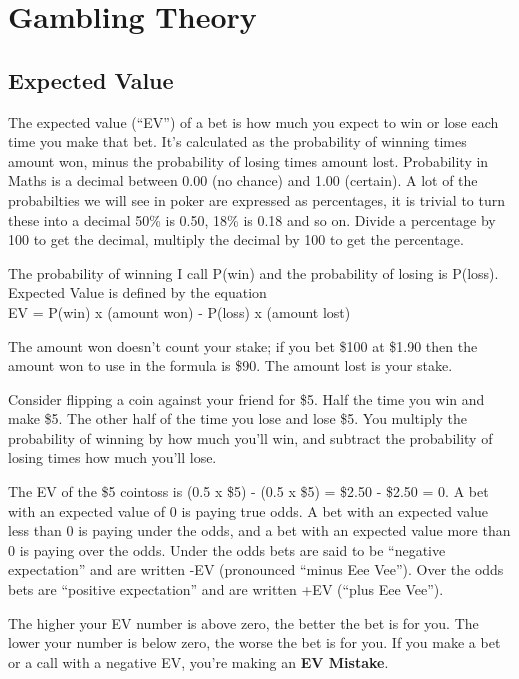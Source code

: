 \chapter{Gambling Theory}



\section{Expected Value}

The expected value (``EV'') of a bet is how much you expect to win or lose
each time you make that bet. It's calculated as the probability of
winning times amount won, minus the probability of losing times amount
lost. Probability in Maths is a decimal between 0.00 (no chance)
and 1.00 (certain). A lot of the probabilties we will see in poker
are expressed as percentages, it is trivial to turn these into a decimal
50\% is 0.50, 18\% is 0.18 and so on. Divide a percentage by 100 to
get the decimal, multiply the decimal by 100 to get the percentage.

The probability of winning I call P(win) and the probability of losing
is P(loss). Expected Value is defined by the equation \\
EV = P(win) x (amount won) - P(loss) x (amount lost)

The amount won doesn't count your stake; if you bet \$100 at \$1.90
then the amount won to use in the formula is \$90. The amount lost
is your stake.

Consider flipping a coin against your friend
for \$5. Half the time you win and make \$5. The other half of the
time you lose and lose \$5. You multiply the probability of winning
by how much you'll win, and subtract the probability of losing times
how much you'll lose.

The EV of the \$5 cointoss is (0.5 x \$5) - (0.5 x \$5)
= \$2.50 - \$2.50 = 0. A bet with an expected value of 0 is
paying true odds. A bet with an expected value less than 0 is
paying under the odds, and a bet with an expected value more than
0 is paying over the odds. Under the odds bets are said to be
``negative expectation'' and are written -EV (pronounced ``minus Eee Vee'').
Over the odds bets are ``positive expectation'' and are written +EV
(``plus Eee Vee'').

The higher your EV number is above zero, the better the bet is for
you. The lower your number is below zero, the worse the bet is for
you. If you make a bet or a call with a negative EV, you're making an
\textbf{EV Mistake}.

